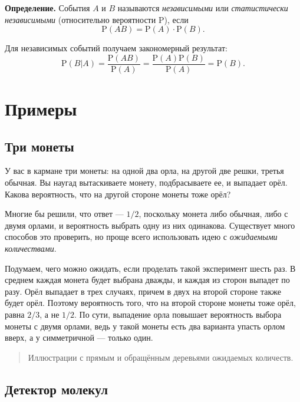 \documentclass[11pt,a4paper]{article}
\begin{document}
\textbf{Определение.} События \(A\) и \(B\) называются
\emph{независимыми} или \emph{статистически независимыми} (относительно
вероятности \(\mathrm{P}\)), если
\[ \mathrm{P}(AB) = \mathrm{P}(A) \cdot \mathrm{P}(B). \]

Для независимых событий получаем закономерный результат:
\[ \mathrm{P}(B|A) = \dfrac{\mathrm{P}(AB)}{\mathrm{P}(A)} = \dfrac{\mathrm{P}(A)\mathrm{P}(B)}{\mathrm{P}(A)} = \mathrm{P}(B). \]

    \hypertarget{ux43fux440ux438ux43cux435ux440ux44b}{%
\section{Примеры}\label{ux43fux440ux438ux43cux435ux440ux44b}}

\hypertarget{ux442ux440ux438-ux43cux43eux43dux435ux442ux44b}{%
\subsection{Три
монеты}\label{ux442ux440ux438-ux43cux43eux43dux435ux442ux44b}}

У вас в кармане три монеты: на одной два орла, на другой две решки,
третья обычная. Вы наугад вытаскиваете монету, подбрасываете ее, и
выпадает орёл. Какова вероятность, что на другой стороне монеты тоже
орёл?

Многие бы решили, что ответ --- \(1/2\), поскольку монета либо обычная,
либо с двумя орлами, и вероятность выбрать одну из них одинакова.
Существует много способов это проверить, но проще всего использовать
идею с \emph{ожидаемыми количествами}.

Подумаем, чего можно ожидать, если проделать такой эксперимент шесть
раз. В среднем каждая монета будет выбрана дважды, и каждая из сторон
выпадет по разу. Орёл выпадает в трех случаях, причем в двух на второй
стороне также будет орёл. Поэтому вероятность того, что на второй
стороне монеты тоже орёл, равна \(2/3\), а не \(1/2\). По сути,
выпадение орла повышает вероятность выбора монеты с двумя орлами, ведь у
такой монеты есть два варианта упасть орлом вверх, а у симметричной ---
только один.

\begin{quote}
Иллюстрации с прямым и обращённым деревьями ожидаемых количеств.
\end{quote}

    \hypertarget{ux434ux435ux442ux435ux43aux442ux43eux440-ux43cux43eux43bux435ux43aux443ux43b}{%
\subsection{Детектор
молекул}\label{ux434ux435ux442ux435ux43aux442ux43eux440-ux43cux43eux43bux435ux43aux443ux43b}}
\end{document}
